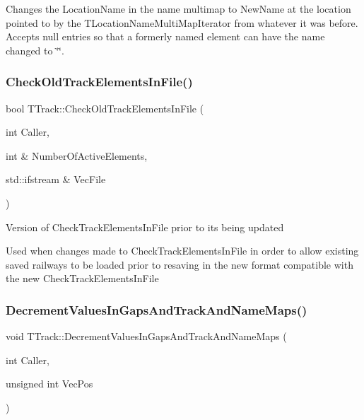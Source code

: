 Changes the Location\+Name in the name multimap to New\+Name at the location pointed to by the T\+Location\+Name\+Multi\+Map\+Iterator from whatever it was before. Accepts null entries so that a formerly named element can have the name changed to \char`\"{}\char`\"{}. \mbox{\label{class_t_track_a07cde3507d67aff8eac4255ef28fde16}} 
\subsubsection{\texorpdfstring{Check\+Old\+Track\+Elements\+In\+File()}{CheckOldTrackElementsInFile()}}
{\footnotesize\ttfamily bool T\+Track\+::\+Check\+Old\+Track\+Elements\+In\+File (\begin{DoxyParamCaption}\item[{int}]{Caller,  }\item[{int \&}]{Number\+Of\+Active\+Elements,  }\item[{std\+::ifstream \&}]{Vec\+File }\end{DoxyParamCaption})}

Version of Check\+Track\+Elements\+In\+File prior to its being updated

Used when changes made to Check\+Track\+Elements\+In\+File in order to allow existing saved railways to be loaded prior to resaving in the new format compatible with the new Check\+Track\+Elements\+In\+File \mbox{\label{class_t_track_a2095a52c4b914bf6b29529a2d82043e9}} 
\subsubsection{\texorpdfstring{Decrement\+Values\+In\+Gaps\+And\+Track\+And\+Name\+Maps()}{DecrementValuesInGapsAndTrackAndNameMaps()}}
{\footnotesize\ttfamily void T\+Track\+::\+Decrement\+Values\+In\+Gaps\+And\+Track\+And\+Name\+Maps (\begin{DoxyParamCaption}\item[{int}]{Caller,  }\item[{unsigned int}]{Vec\+Pos }\end{DoxyParamCaption})}

